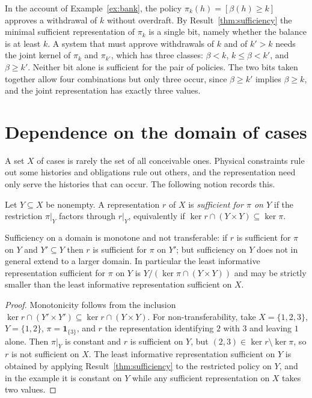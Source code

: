 \begin{example}\label{ex:thresholds-one-two}
In the account of Example~\ref{ex:bank}, the policy $\pi_k(h)=[\beta(h)\ge k]$ approves a withdrawal of $k$ without overdraft. By Result~\ref{thm:sufficiency} the minimal sufficient representation of $\pi_k$ is a single bit, namely whether the balance is at least $k$. A system that must approve withdrawals of $k$ and of $k'>k$ needs the joint kernel of $\pi_k$ and $\pi_{k'}$, which has three classes: $\beta<k$, $k\le\beta<k'$, and $\beta\ge k'$. Neither bit alone is sufficient for the pair of policies. The two bits taken together allow four combinations but only three occur, since $\beta\ge k'$ implies $\beta\ge k$, and the joint representation has exactly three values.
\end{example}

\section{Dependence on the domain of cases}

A set $X$ of cases is rarely the set of all conceivable ones. Physical constraints rule out some histories and obligations rule out others, and the representation need only serve the histories that can occur. The following notion records this.

\begin{definition}\label{def:domain-sufficient}
Let $Y\subseteq X$ be nonempty. A representation $r$ of $X$ is \emph{sufficient for $\pi$ on $Y$} if the restriction $\pi|_Y$ factors through $r|_Y$, equivalently if $\ker r\cap(Y\times Y)\subseteq\ker\pi$.
\end{definition}

\begin{newresult}\label{prop:domain}
Sufficiency on a domain is monotone and not transferable: if $r$ is sufficient for $\pi$ on $Y$ and $Y'\subseteq Y$ then $r$ is sufficient for $\pi$ on $Y'$; but sufficiency on $Y$ does not in general extend to a larger domain. In particular the least informative representation sufficient for $\pi$ on $Y$ is $Y/{(\ker\pi\cap(Y\times Y))}$ and may be strictly smaller than the least informative representation sufficient on $X$.
\end{newresult}
\begin{proof}
Monotonicity follows from the inclusion $\ker r\cap(Y'\times Y')\subseteq\ker r\cap(Y\times Y)$. For non-transferability, take $X=\{1,2,3\}$, $Y=\{1,2\}$, $\pi=\mathbf 1_{\{3\}}$, and $r$ the representation identifying $2$ with $3$ and leaving $1$ alone. Then $\pi|_Y$ is constant and $r$ is sufficient on $Y$, but $(2,3)\in\ker r\setminus\ker\pi$, so $r$ is not sufficient on $X$. The least informative representation sufficient on $Y$ is obtained by applying Result~\ref{thm:sufficiency} to the restricted policy on $Y$, and in the example it is constant on $Y$ while any sufficient representation on $X$ takes two values.
\end{proof}

